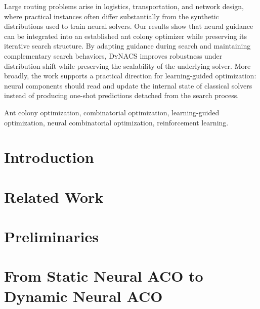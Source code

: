 \documentclass[journal]{IEEEtai}
\newcommand{\DyNACS}{\textsc{DyNACS}}
\begin{document}
\begin{IEEEImpStatement}
Large routing problems arise in logistics, transportation, and network design, where practical instances often differ substantially from the synthetic distributions used to train neural solvers. Our results show that neural guidance can be integrated into an established ant colony optimizer while preserving its iterative search structure. By adapting guidance during search and maintaining complementary search behaviors, \DyNACS{} improves robustness under distribution shift while preserving the scalability of the underlying solver. More broadly, the work supports a practical direction for learning-guided optimization: neural components should read and update the internal state of classical solvers instead of producing one-shot predictions detached from the search process.
\end{IEEEImpStatement}


\begin{IEEEkeywords}
Ant colony optimization, combinatorial optimization, learning-guided optimization, neural combinatorial optimization, reinforcement learning.
\end{IEEEkeywords}

\section{Introduction}


\section{Related Work}
\label{sec:related_work}


\section{Preliminaries}
\label{sec:prelim}


\section{From Static Neural ACO to Dynamic Neural ACO}
\label{sec:method}

\end{document}
